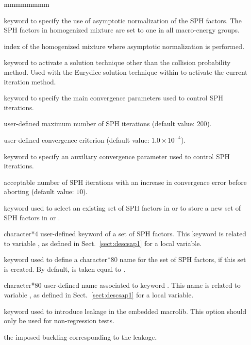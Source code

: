 \begin{ListeDeDescription}{mmmmmmmm}
\item[\moc{ASYM}] keyword to specify the use of asymptotic normalization of the
SPH factors. The SPH factors in homogenized mixture  are set to one
in all macro-energy groups.

\item[\dusa{mixs}] index of the homogenized mixture where asymptotic normalization
is performed.

\item[\moc{ARM}] keyword to activate a solution technique other than the collision probability method. Used with the Eurydice
solution technique within  to activate the current iteration method.

\item[\moc{ITER}] keyword to specify the main convergence parameters used to control SPH iterations.

\item[\dusa{maxout}] user-defined maximum number of SPH iterations (default value: $200$).

\item[\dusa{epsout}] user-defined convergence criterion (default value: $1.0 \times 10^{-4}$).

\item[\moc{MAXNB}] keyword to specify an auxiliary convergence parameter used to control SPH iterations.

\item[\dusa{maxnb}] acceptable number of SPH iterations with an increase in convergence error before
aborting (default value: $10$).

\item[\moc{EQUI}] keyword used to select an existing set of SPH factors in  or to store
a new set of SPH factors in  or .

\item[\dusa{TEXT4}] character*4 user-defined keyword of a set of SPH factors. This keyword is related to variable
, as defined in Sect.~\ref{sect:descsap1} for a local variable.

\item[\moc{LOCNAM}] keyword used to define a character*80 name for the set of SPH factors, if this set is created. By
default,  is taken equal to .

\item[\dusa{TEXT80}] character*80 user-defined name associated to keyword . This name is related to
variable , as defined in Sect.~\ref{sect:descsap1} for a local variable.

\item[\moc{LEAK}] keyword used to introduce leakage in the embedded {\sc macrolib}. This option should only be used for non-regression tests.

\item[\dusa{b2}] the imposed buckling corresponding to the leakage.

\end{ListeDeDescription}
\eject
